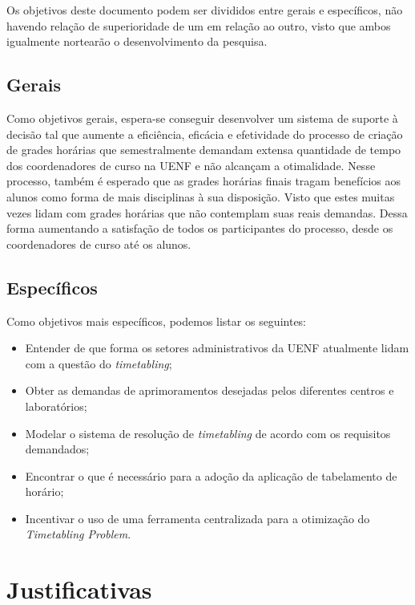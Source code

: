 Os objetivos deste documento podem ser divididos entre gerais e específicos, não havendo relação de superioridade de um em relação ao outro, visto que ambos igualmente nortearão o desenvolvimento da pesquisa.

\subsection{Gerais} \label{subsec:Gerais} %

Como objetivos gerais, espera-se conseguir desenvolver um sistema de suporte à decisão tal que aumente a eficiência, eficácia e efetividade do processo de criação de grades horárias que semestralmente demandam extensa quantidade de tempo dos coordenadores de curso na UENF e não alcançam a otimalidade. Nesse processo, também é esperado que as grades horárias finais tragam benefícios aos alunos como forma de mais disciplinas à sua disposição. Visto que estes muitas vezes lidam com grades horárias que não contemplam suas reais demandas. Dessa forma aumentando a satisfação de todos os participantes do processo, desde os coordenadores de curso até os alunos.

\subsection{Específicos} \label{subsec: EspeEspecíficos} %

Como objetivos mais específicos, podemos listar os seguintes:

\begin{itemize}
  \item Entender de que forma os setores administrativos da UENF atualmente lidam com a questão do \textit{timetabling};
  \item Obter as demandas de aprimoramentos desejadas pelos diferentes centros e laboratórios;
  \item Modelar o sistema de resolução de \textit{timetabling} de acordo com os requisitos demandados;
  \item Encontrar o que é necessário para a adoção da aplicação de tabelamento de horário;
  \item Incentivar o uso de uma ferramenta centralizada para a otimização do \textit{Timetabling Problem}.
\end{itemize}

\section{Justificativas} \label{sec:Justificativas} %

